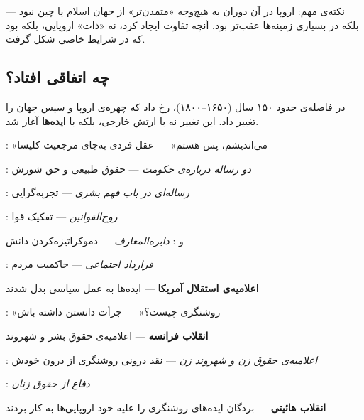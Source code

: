 نکته‌ی مهم: اروپا در آن دوران به هیچ‌وجه «متمدن‌تر» از جهان اسلام یا
چین نبود — بلکه در بسیاری زمینه‌ها عقب‌تر بود.  آنچه تفاوت ایجاد کرد،
نه «ذات» اروپایی، بلکه  بود که در شرایط خاصی شکل
گرفت.


\subsection{چه اتفاقی افتاد؟}

در فاصله‌ی حدود ۱۵۰ سال (۱۶۵۰–۱۸۰۰)،  رخ داد که
چهره‌ی اروپا و سپس جهان را تغییر داد.  این تغییر نه با ارتش خارجی، بلکه
با \textbf{ایده‌ها} آغاز شد.

\begin{tcolorbox}[timelinebox, title={خط زمانی: از ایده تا انقلاب}]
\begin{description}[leftmargin=!, labelwidth=3cm, font=\bfseries\color{PrimaryMid}]
\item[۱۶۳۷] : «می‌اندیشم، پس هستم» — عقل فردی به‌جای
  مرجعیت کلیسا
\item[۱۶۸۹] : \textit{دو رساله درباره‌ی حکومت} — حقوق
  طبیعی و حق شورش
\item[۱۶۹۰] : \textit{رساله‌ای در باب فهم بشری} — تجربه‌گرایی
\item[۱۷۴۸] : \textit{روح‌القوانین} — تفکیک قوا
\item[۱۷۵۱]  و : \textit{دایره‌المعارف} — دموکراتیزه‌کردن دانش
\item[۱۷۶۲] : \textit{قرارداد اجتماعی} — حاکمیت مردم

\item[۱۷۷۶] \textbf{اعلامیه‌ی استقلال آمریکا} — ایده‌ها به عمل سیاسی بدل شدند
\item[۱۷۸۴] : «روشنگری چیست؟» — 
  جرأت دانستن داشته باش
\item[۱۷۸۹] \textbf{انقلاب فرانسه} — اعلامیه‌ی حقوق بشر و شهروند
\item[۱۷۹۱] : \textit{اعلامیه‌ی حقوق زن و شهروند
  زن} — نقد درونی روشنگری از درون خودش
\item[۱۷۹۲] : \textit{دفاع از حقوق زنان}
\item[۱۸۰۴] \textbf{انقلاب هائیتی} — بردگان ایده‌های روشنگری را علیه
  خود اروپایی‌ها به کار بردند
\end{description}
\end{tcolorbox}

